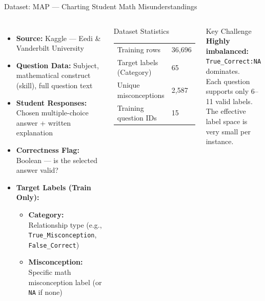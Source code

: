 ﻿\documentclass[aspectratio=169,10pt]{beamer}
\begin{document}
\begin{frame}{Dataset: MAP --- Charting Student Math Misunderstandings}
\begin{columns}[T]
\begin{itemize}
  \item \textbf{Source:} Kaggle --- Eedi \& Vanderbilt University
  \item \textbf{Question Data:} Subject, mathematical construct (skill), full question text
  \item \textbf{Student Responses:} Chosen multiple-choice answer + written explanation
  \item \textbf{Correctness Flag:} Boolean --- is the selected answer valid?
  \item \textbf{Target Labels (Train Only):}
  \begin{itemize}
    \item \textbf{Category:} Relationship type (e.g., \texttt{True\_Misconception}, \texttt{False\_Correct})
    \item \textbf{Misconception:} Specific math misconception label (or \texttt{NA} if none)
  \end{itemize}
\end{itemize}
\begin{block}{Dataset Statistics}
\begin{tabular}{ll}
Training rows & 36{,}696 \\
Target labels (Category) & 65 \\
Unique misconceptions & 2{,}587 \\
Training question IDs & 15 \\
\end{tabular}
\end{block}
\vspace{6pt}
\begin{alertblock}{Key Challenge}
\textbf{Highly imbalanced:}\\
\texttt{True\_Correct:NA} dominates.\\
Each question supports only 6--11 valid labels.\\
The effective label space is very small per instance.
\end{alertblock}
\end{columns}
\end{frame}
\end{document}
